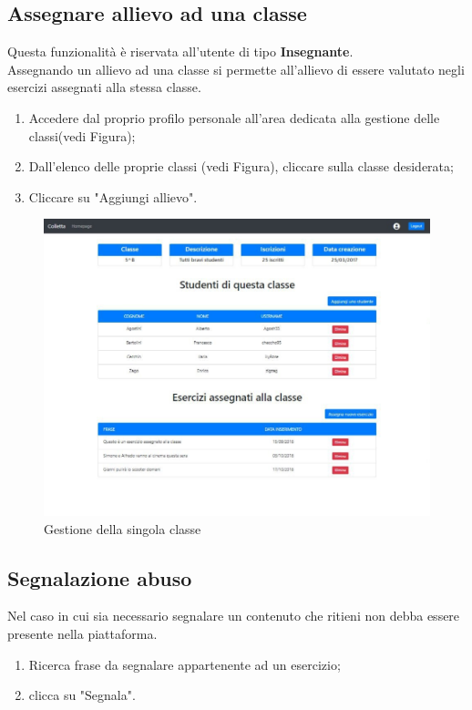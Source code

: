 \documentclass[11pt,a4paper]{article}
\begin{document}
{		\subsection{Assegnare allievo ad una classe}
		Questa funzionalità è riservata all'utente di tipo \textbf{Insegnante}.\\
		Assegnando un allievo ad una classe si permette all'allievo di essere valutato negli esercizi assegnati alla stessa classe.
		\begin{enumerate}
			\item Accedere dal proprio profilo personale all'area dedicata alla gestione delle classi(vedi Figura);
			\item Dall'elenco delle proprie classi (vedi Figura), cliccare sulla classe desiderata;
			\item Cliccare su "Aggiungi allievo".
		\end{enumerate}
	
		\begin{figure}[h!]
		\centering
		\includegraphics[scale=0.65]{images/gestioneclasse.jpg}
		\caption{Gestione della singola classe}
	\end{figure}
			
	\subsection{Segnalazione abuso}
	Nel caso in cui sia necessario segnalare un contenuto che ritieni non debba essere presente nella piattaforma.
	\begin{enumerate}
		\item Ricerca frase da segnalare appartenente ad un esercizio;
		\item clicca su "Segnala".
	\end{enumerate}
		
}
\end{document}
